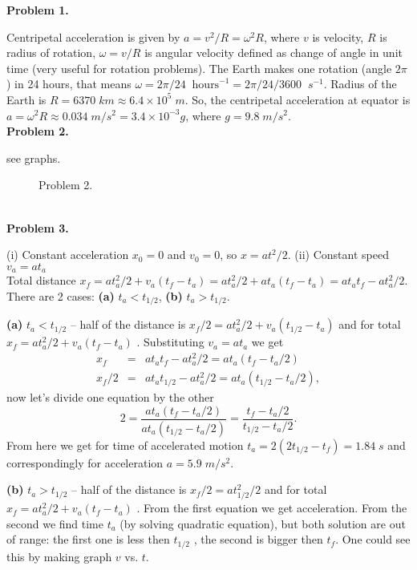 \documentclass[12pt]{article}
\def\be{\begin{eqnarray}}
\def\ee{\end{eqnarray}}
\begin{document}
{\bf Problem 1.}

Centripetal acceleration is given by $a=v^2/R=\omega^2 R$, where $v$ is velocity, $R$ is radius of rotation, $\omega=v/R$ is angular velocity defined as change of angle in unit time
(very useful for rotation problems). The Earth makes one rotation (angle $2\pi$) in 24 hours,
that means $\omega=2\pi/24\;\;\mbox{hours}^{-1}=2\pi/24/3600\;\;s^{-1}$.  Radius of the Earth is
$R=6370\;km\approx 6.4\times10^5\;m$. So, the centripetal acceleration at equator is
$a=\omega^2 R\approx 0.034\;m/s^2 =3.4\times 10^{-3} g$, where $g=9.8\;m/s^2$.
\\

{\bf Problem 2.}

see graphs.
\begin{figure}[p]
\begin{center}
\caption{Problem 2.}
\end{center}
\end{figure}
\\

{\bf Problem 3.}

(i) Constant acceleration $x_0=0$ and $v_0=0$, so $x=a t^2/2$.
(ii) Constant speed $v_a=at_a$\\
Total distance $x_f=at_a^2/2+v_a(t_f-t_a)=at_a^2/2+at_a(t_f-t_a)=at_a t_f -at_a^2/2$.
There are 2 cases: {\bf (a)} $t_a<t_{1/2}$, {\bf (b)} $t_a>t_{1/2}$.

{\bf (a)} $t_a<t_{1/2}$ -- half of the distance is $x_f/2=at_{a}^2/2 + v_a(t_{1/2}-t_{a})$ and
 for total $x_f=at_{a}^2/2 + v_a(t_{f}-t_{a})$ . Substituting $v_a=at_a$ we get
 \be
x_f&=&at_a t_f -at_{a}^2/2 =at_a\left( t_f -t_a/2\right)\\
x_f/2&=&at_a t_{1/2} -at_{a}^2/2 =at_a\left( t_{1/2} -t_a/2\right),
\ee
now let's divide one equation by the other
$$2=\frac{at_a\left( t_f -t_a/2\right)}{at_a\left( t_{1/2} -t_a/2\right)}=\frac{ t_f -t_a/2}{ t_{1/2} -t_a/2}.
$$
From here we get for time of accelerated motion $t_a=2(2t_{1/2}-t_f)=1.84\;s$ and correspondingly for acceleration $a=5.9 \;m/s^2$.

{\bf (b)} $t_a>t_{1/2}$ -- half of the distance is $x_f/2=at_{1/2}^2/2$  and
 for total $x_f=at_{a}^2/2 + v_a(t_{f}-t_{a})$ .  From the first equation we get acceleration.
 From the second we find time $t_a$ (by solving quadratic equation),  but both solution
 are out of range: the first one is less then $t_{1/2}$ , the second is bigger then $t_f$. One
 could see this by making graph $v$ vs. $t$.

 
\end{document}
